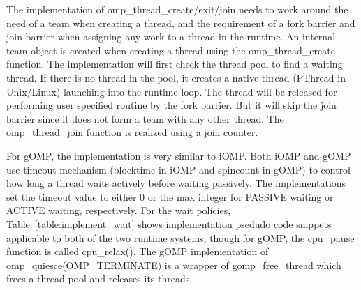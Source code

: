 The implementation of  {\sf omp\_thread\_create/exit/join} needs to work around the need of a team when creating a thread, and the requirement 
of a fork barrier and join barrier when assigning any work to a thread in the runtime. An internal team object is created when creating a thread 
using the {\sf omp\_thread\_create} function. The implementation will first check the thread pool to find a waiting thread. If there is no thread
in the pool, it creates a native thread (PThread in Unix/Linux) launching into the runtime loop. The thread will be released for performing
user specified routine by the fork barrier. But it will skip the join barrier since it does not form a team with any other thread. 
The {\sf omp\_thread\_join} function is realized using a join counter. 

For gOMP, the implementation is very similar to iOMP.
Both iOMP and gOMP use timeout mechanism (blocktime in iOMP and spincount in gOMP) 
to control how long a thread waits actively before waiting passively. The implementations set the timeout value to either 0 or the max integer 
for {\sf PASSIVE} waiting or {\sf ACTIVE} waiting, respectively. 
For the wait policies, Table~\ref{table:implement_wait} shows implementation psedudo code snippets applicable to both of 
the two runtime systems, though for gOMP, the cpu\_pause function is called cpu\_relax().  
The gOMP implementation of {\sf omp\_quiesce(OMP\_TERMINATE)} is a wrapper of {\sf gomp\_free\_thread} 
which frees a thread pool and releases its threads. 


